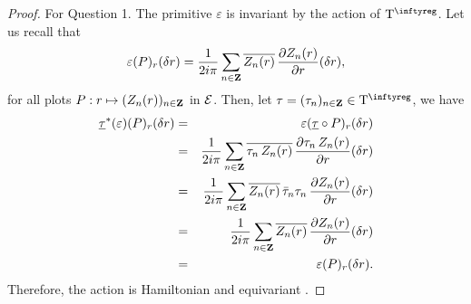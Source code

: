 \begin{proof}
  For Question 1. The primitive $\varepsilon$ is invariant by the action of $\Torus^\infty$. Let us recall that
  $$
    \varepsilon(P)_r(\delta r)  = {1 \over 2i\pi}\sum_{n\in\mathbf{Z}} \overline{Z_n(r)} \, {\partial  Z_n(r) \over \partial r}(\delta r),
    $$
  for all plots $P : r \mapsto (Z_n(r))_{n\in\mathbf{Z}}$ in $\mathcal{E}$.
  Then, let $\tau=(\tau_n)_{n\in\ZZ} \in \Torus^\infty$, we have
  \begin{eqnarray*}
    \underline{\tau}^*(\varepsilon)(P)_r(\delta r)&  =& \varepsilon(\underline{\tau} \circ P)_r(\delta r) \\
    & = &  {1 \over 2i\pi}\sum_{n\in\mathbf{Z}} \overline{\tau_n\,  Z_n(r)} \, {\partial \tau_n\,  Z_n(r) \over \partial r}(\delta r)\\
    & = &  {1 \over 2i\pi}\sum_{n\in\mathbf{Z}} \overline{Z_n(r)}\, \bar \tau_n \tau_n \, {\partial   Z_n(r) \over \partial r}(\delta r) \\
    & = &  {1 \over 2i\pi}\sum_{n\in\mathbf{Z}} \overline{Z_n(r)}\,{\partial   Z_n(r) \over \partial r}(\delta r)\\
    & = & \varepsilon(P)_r(\delta r).
  \end{eqnarray*}
  Therefore, the action is Hamiltonian and equivariant \cite[\textsection\,9.11]{PIZ13}.
  

\end{proof}
